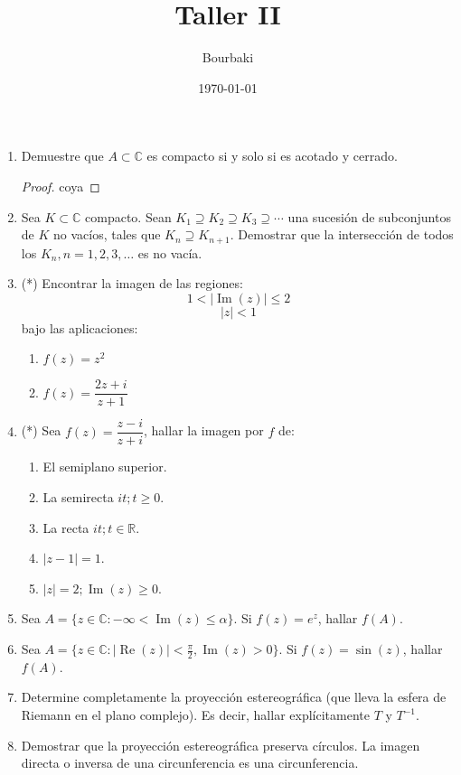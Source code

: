 \documentclass[11pt]{article}
\title{Taller II}
\author{Bourbaki}
\date{\today}
\begin{document}
\maketitle


\begin{enumerate}
    \item Demuestre que \( A \subset \mathbb{C} \) es compacto si y solo si es acotado y cerrado.

    \begin{proof}
    coya
    \end{proof}

    \item Sea \( K \subset \mathbb{C} \) compacto. Sean \( K_1 \supseteq K_2 \supseteq K_3 \supseteq \cdots \) una sucesión de subconjuntos de \( K \) no vacíos, tales que \( K_n \supseteq K_{n+1} \). Demostrar que la intersección de todos los \( K_n, n = 1, 2, 3, \ldots \) es no vacía.

    \item (*) Encontrar la imagen de las regiones:
    \[
    1 < | \operatorname{Im}(z) | \leq 2
    \]
    \[
    |z| < 1
    \]
    bajo las aplicaciones:
    \begin{enumerate}
        \item \( f(z) = z^2 \)
        \item \( f(z) = \dfrac{2z + i}{z + 1} \)
    \end{enumerate}

    \item (*) Sea \( f(z) = \dfrac{z - i}{z + i} \), hallar la imagen por \( f \) de:
    \begin{enumerate}
        \item El semiplano superior.
        \item La semirecta \( it; t \geq 0 \).
        \item La recta \( it; t \in \mathbb{R} \).
        \item \( |z - 1| = 1 \).
        \item \( |z| = 2; \operatorname{Im}(z) \geq 0 \).
    \end{enumerate}

    \item Sea \( A = \{ z \in \mathbb{C} : -\infty < \operatorname{Im}(z) \leq \alpha \} \). Si \( f(z) = e^z \), hallar \( f(A) \).

    \item Sea \( A = \{ z \in \mathbb{C} : |\operatorname{Re}(z)| < \frac{\pi}{2}, \operatorname{Im}(z) > 0 \} \). Si \( f(z) = \sin(z) \), hallar \( f(A) \).

    \item Determine completamente la proyección estereográfica (que lleva la esfera de Riemann en el plano complejo). Es decir, hallar explícitamente \( T \) y \( T^{-1} \).

    \item Demostrar que la proyección estereográfica preserva círculos. La imagen directa o inversa de una circunferencia es una circunferencia.
\end{enumerate}
\end{document}

